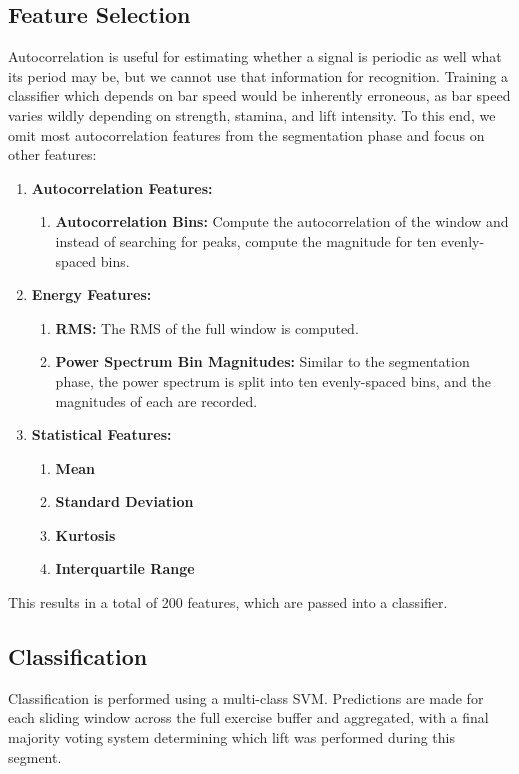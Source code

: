 \subsection{Feature Selection}
Autocorrelation is useful for estimating whether a signal is periodic as well what its period may be, but we cannot use that information for recognition. Training a classifier which depends on bar speed would be inherently erroneous, as bar speed varies wildly depending on strength, stamina, and lift intensity. To this end, we omit most autocorrelation features from the segmentation phase and focus on other features:

\begin{enumerate}
    \item \textbf{Autocorrelation Features:}
    \begin{enumerate}
        \item \textbf{Autocorrelation Bins:} Compute the autocorrelation of the window and instead of searching for peaks, compute the magnitude for ten evenly-spaced bins.
    \end{enumerate}
    \item \textbf{Energy Features:}
    \begin{enumerate}
        \item \textbf{RMS:} The RMS of the full window is computed. 
        \item \textbf{Power Spectrum Bin Magnitudes:} Similar to the segmentation phase, the power spectrum is split into ten evenly-spaced bins, and the magnitudes of each are recorded.
    \end{enumerate}
    \item \textbf{Statistical Features:}
    \begin{enumerate}
        \item \textbf{Mean}
        \item \textbf{Standard Deviation}
        \item \textbf{Kurtosis}
        \item \textbf{Interquartile Range}
    \end{enumerate}
\end{enumerate}

This results in a total of 200 features, which are passed into a classifier.

\subsection{Classification}
Classification is performed using a multi-class SVM. Predictions are made for each sliding window across the full exercise buffer and aggregated, with a final majority voting system determining which lift was performed during this segment.

